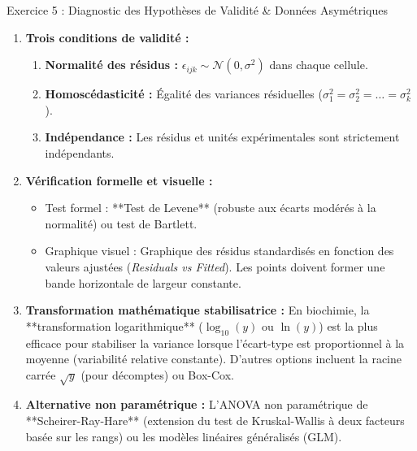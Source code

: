 \documentclass[11pt,a4paper]{article}
\begin{document}
\begin{solutionbox}{Exercice 5 : Diagnostic des Hypothèses de Validité \& Données Asymétriques}
\begin{enumerate}[label=\textbf{\alph*.}]
  \item \textbf{Trois conditions de validité :}
  \begin{enumerate}
    \item \textbf{Normalité des résidus :} $\epsilon_{ijk} \sim \mathcal{N}(0, \sigma^2)$ dans chaque cellule.
    \item \textbf{Homoscédasticité :} Égalité des variances résiduelles ($\sigma_1^2 = \sigma_2^2 = \dots = \sigma_k^2$).
    \item \textbf{Indépendance :} Les résidus et unités expérimentales sont strictement indépendants.
  \end{enumerate}

  \item \textbf{Vérification formelle et visuelle :}
  \begin{itemize}
    \item Test formel : **Test de Levene** (robuste aux écarts modérés à la normalité) ou test de Bartlett.
    \item Graphique visuel : Graphique des résidus standardisés en fonction des valeurs ajustées (\textit{Residuals vs Fitted}). Les points doivent former une bande horizontale de largeur constante.
  \end{itemize}

  \item \textbf{Transformation mathématique stabilisatrice :}
  En biochimie, la **transformation logarithmique** ($\log_{10}(y)$ ou $\ln(y)$) est la plus efficace pour stabiliser la variance lorsque l'écart-type est proportionnel à la moyenne (variabilité relative constante). D'autres options incluent la racine carrée $\sqrt{y}$ (pour décomptes) ou Box-Cox.

  \item \textbf{Alternative non paramétrique :}
  L'ANOVA non paramétrique de **Scheirer-Ray-Hare** (extension du test de Kruskal-Wallis à deux facteurs basée sur les rangs) ou les modèles linéaires généralisés (GLM).
\end{enumerate}
\end{solutionbox}
\end{document}
